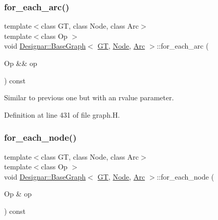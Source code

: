 \subsubsection{\texorpdfstring{for\+\_\+each\+\_\+arc()}{for\_each\_arc()}\hspace{0.1cm}{\footnotesize\ttfamily [2/2]}}
{\footnotesize\ttfamily template$<$class GT, class Node, class Arc$>$ \\
template$<$class Op $>$ \\
void \hyperlink{class_designar_1_1_base_graph}{Designar\+::\+Base\+Graph}$<$ \hyperlink{demo-buildgraph_8_c_a3001c40d2c31ca87ed96cd7d1334a55e}{GT}, \hyperlink{namespace_designar_a5af326c65aa2bd26b26c410f2030d09e}{Node}, \hyperlink{namespace_designar_a3f55fb5513d62ff47cbc8f72b8e95d6f}{Arc} $>$\+::for\+\_\+each\+\_\+arc (\begin{DoxyParamCaption}\item[{Op \&\&}]{op }\end{DoxyParamCaption}) const\hspace{0.3cm}{\ttfamily [inline]}}



Similar to previous one but with an rvalue parameter. 



Definition at line 431 of file graph.\+H.

\mbox{\label{class_designar_1_1_base_graph_a9497531ac221edb5c5ef19888f78ad3c}} 
\subsubsection{\texorpdfstring{for\+\_\+each\+\_\+node()}{for\_each\_node()}\hspace{0.1cm}{\footnotesize\ttfamily [1/2]}}
{\footnotesize\ttfamily template$<$class GT, class Node, class Arc$>$ \\
template$<$class Op $>$ \\
void \hyperlink{class_designar_1_1_base_graph}{Designar\+::\+Base\+Graph}$<$ \hyperlink{demo-buildgraph_8_c_a3001c40d2c31ca87ed96cd7d1334a55e}{GT}, \hyperlink{namespace_designar_a5af326c65aa2bd26b26c410f2030d09e}{Node}, \hyperlink{namespace_designar_a3f55fb5513d62ff47cbc8f72b8e95d6f}{Arc} $>$\+::for\+\_\+each\+\_\+node (\begin{DoxyParamCaption}\item[{Op \&}]{op }\end{DoxyParamCaption}) const\hspace{0.3cm}{\ttfamily [inline]}}



